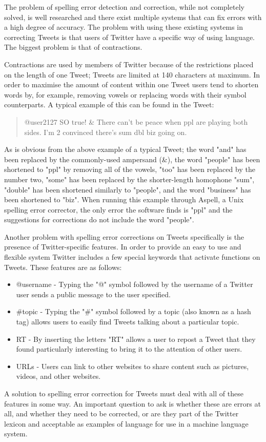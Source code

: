 The problem of spelling error detection and correction, while not completely solved, is well researched and there exist multiple systems that can fix errors with a high degree of accuracy. The problem with using these existing systems in correcting Tweets is that users of Twitter have a specific way of using language. The biggest problem is that of contractions.

Contractions are used by members of Twitter because of the restrictions placed on the length of one Tweet; Tweets are limited at 140 characters at maximum. In order to maximise the amount of content within one Tweet users tend to shorten words by, for example, removing vowels or replacing words with their symbol counterparts. A typical example of this can be found in the Tweet:
\begin{quote}
@user2127 SO true! \& There can't be peace when ppl are playing both sides. I'm 2 convinced there's sum dbl biz going on.
\end{quote}
As is obvious from the above example of a typical Tweet; the word "and" has been replaced by the commonly-used ampersand (\&), the word "people" has been shortened to "ppl" by removing all of the vowels, "too" has been replaced by the number two, "some" has been replaced by the shorter-length homophone "sum", "double" has been shortened similarly to "people", and the word "business" has been shortened to "biz". When running this example through Aspell, a Unix spelling error corrector, the only error the software finds is "ppl" and the suggestions for corrections do not include the word "people".

Another problem with spelling error corrections on Tweets specifically is the presence of Twitter-specific features. In order to provide an easy to use and flexible system Twitter includes a few special keywords that activate functions on Tweets. These features are as follows:
\begin{itemize}
\item
@username - Typing the "@" symbol followed by the username of a Twitter user sends a public message to the user specified.
\item
#topic - Typing the "#" symbol followed by a topic (also known as a hash tag) allows users to easily find Tweets talking about a particular topic.
\item
RT - By inserting the letters "RT" allows a user to repost a Tweet that they found particularly interesting to bring it to the attention of other users.
\item
URLs - Users can link to other websites to share content such as pictures, videos, and other websites.
\end{itemize}
A solution to spelling error correction for Tweets must deal with all of these features in some way. An important question to ask is whether these are errors at all, and whether they need to be corrected, or are they part of the Twitter lexicon and acceptable as examples of language for use in a machine language system.

